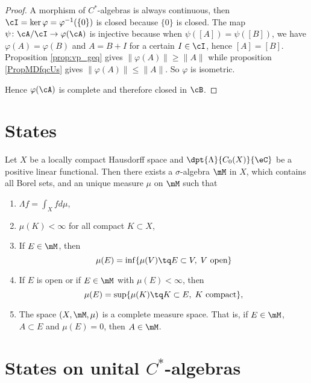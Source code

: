 \begin{proof}
    A morphism of $C^*$-algebras is always continuous,%
    then $\cI=\ker\varphi=\varphi^{-1}(\{ 0 \})$ is closed because $\{ 0 \}$ is closed. The map $\psi\colon \cA/\cI\to \varphi(\cA)$ is injective because when $\psi([A])=\psi([B])$, we have $\varphi(A)=\varphi(B)$ and $A=B+I$ for a certain $I\in\cI$, hence $[A]=[B]$. Proposition \ref{prop:vp_geq} gives $\| \varphi(A) \|\geq\| A \|$ while proposition \ref{PropMDfqcUs} gives $\| \varphi(A) \|\leq \| A \|$. So $\varphi$ is isometric.

    Hence $\varphi(\cA)$ is complete and therefore closed in $\cB$.
\end{proof}


\section{States}

\begin{theorem}
Let $X$ be a locally compact Hausdorff space and $\dpt{\Lambda}{C_0(X)}{\eC}$ be a positive linear functional. Then there exists a $\sigma$-algebra $\mM$ in $X$, which contains all Borel sets, and an unique measure $\mu$ on $\mM$ such that

\begin{enumerate}
\item $\Lambda f=\int_Xfd\mu$,
\item $\mu(K)<\infty$ for all compact $K\subset X$,
\item If $E\in\mM$, then
\[ 
  \mu(E)=\inf\{ \mu(V)\tq E\subset V,\; V\textrm{ open} \}
\]
\item If $E$ is open or if $E\in\mM$ with $\mu(E)<\infty$, then
\[ 
  \mu(E)=\sup\{ \mu(K)\tq K\subset E,\; K\textrm{ compact} \},
\]
\item The space $(X,\mM,\mu)$ is a complete measure space. That is, if $E\in\mM$, $A\subset E$ and $\mu(E)=0$, then $A\in\mM$.

\end{enumerate}
\end{theorem}

\section{States on unital \texorpdfstring{$C^*$}{C*}-algebras}

